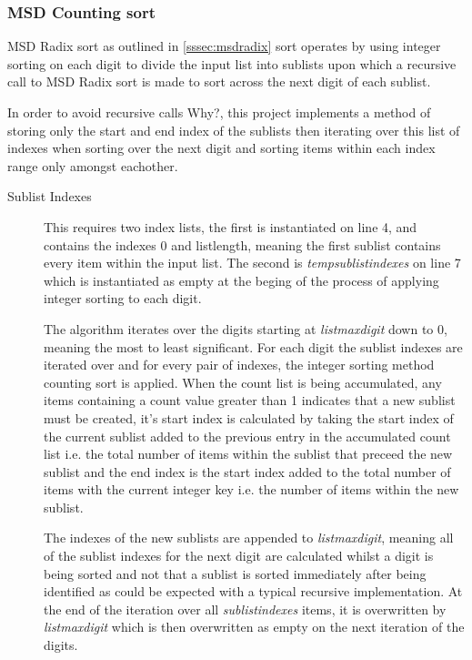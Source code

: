 \documentclass[12pt]{article}
\begin{document}
\subsubsection{MSD Counting sort}
MSD Radix sort as outlined in \ref{sssec:msdradix} sort operates by using integer sorting on each digit to divide the input list into sublists upon which a recursive call to MSD Radix sort is made to sort across the next digit of each sublist.
\par In order to avoid recursive calls {\color{red} Why?}, this project implements a method of storing only the start and end index of the sublists then iterating over this list of indexes when sorting over the next digit and sorting items within each index range only amongst eachother.
\begin{description}
	\item[Sublist Indexes] 
	\par 
	This requires two index lists, the first is instantiated on line 4, and contains the indexes 0 and list\textunderscore length, meaning the first sublist contains every item within the input list. The second is \textit{temp\textunderscore sublist\textunderscore indexes} on line 7 which is instantiated as empty at the beging of the process of applying integer sorting to each digit.
	\par
	The algorithm iterates over the digits starting at \textit{list\textunderscore max\textunderscore digit} down to 0, meaning the most to least significant. For each digit the sublist indexes are iterated over and for every pair of indexes, the integer sorting method counting sort is applied. When the count list is being accumulated, any items containing a count value greater than 1 indicates that a new sublist must be created, it's start index is calculated by taking the start index of the current sublist added to the previous entry in the accumulated count list i.e. the total number of items within the sublist that preceed the new sublist and the end index is the start index added to the total number of items with the current integer key i.e. the number of items within the new sublist.
	\par The indexes of the new sublists are appended to \textit{list\textunderscore max\textunderscore digit}, meaning all of the sublist indexes for the next digit are calculated whilst a digit is being sorted and not that a sublist is sorted immediately after being identified as could be expected with a typical recursive implementation. At the end of the iteration over all \textit{sublist\textunderscore indexes} items, it is overwritten by \textit{list\textunderscore max\textunderscore digit} which is then overwritten as empty on the next iteration of the digits.

\end{description}
\end{document}
